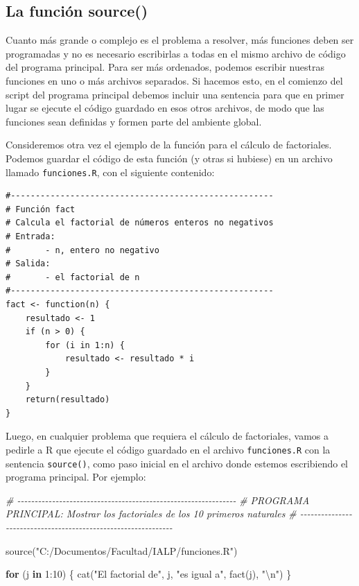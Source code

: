 \documentclass[
]{book}
\newenvironment{Shaded}{\begin{snugshade}}{\end{snugshade}}
\newcommand{\CommentTok}[1]{\textcolor[rgb]{0.56,0.35,0.01}{\textit{#1}}}
\newcommand{\ControlFlowTok}[1]{\textcolor[rgb]{0.13,0.29,0.53}{\textbf{#1}}}
\newcommand{\DecValTok}[1]{\textcolor[rgb]{0.00,0.00,0.81}{#1}}
\newcommand{\FunctionTok}[1]{\textcolor[rgb]{0.00,0.00,0.00}{#1}}
\newcommand{\NormalTok}[1]{#1}
\newcommand{\SpecialCharTok}[1]{\textcolor[rgb]{0.00,0.00,0.00}{#1}}
\newcommand{\StringTok}[1]{\textcolor[rgb]{0.31,0.60,0.02}{#1}}
\begin{document}
\hypertarget{la-funciuxf3n-source}{%
\subsection{La función source()}\label{la-funciuxf3n-source}}

Cuanto más grande o complejo es el problema a resolver, más funciones deben ser programadas y no es necesario escribirlas a todas en el mismo archivo de código del programa principal. Para ser más ordenados, podemos escribir nuestras funciones en uno o más archivos separados. Si hacemos esto, en el comienzo del script del programa principal debemos incluir una sentencia para que en primer lugar se ejecute el código guardado en esos otros archivos, de modo que las funciones sean definidas y formen parte del ambiente global.

Consideremos otra vez el ejemplo de la función para el cálculo de factoriales. Podemos guardar el código de esta función (y otras si hubiese) en un archivo llamado \texttt{funciones.R}, con el siguiente contenido:

\begin{verbatim}
#-----------------------------------------------------
# Función fact
# Calcula el factorial de números enteros no negativos
# Entrada:
#       - n, entero no negativo
# Salida:
#       - el factorial de n
#-----------------------------------------------------
fact <- function(n) {
    resultado <- 1
    if (n > 0) {
        for (i in 1:n) {
            resultado <- resultado * i
        }
    }
    return(resultado)
}
\end{verbatim}

Luego, en cualquier problema que requiera el cálculo de factoriales, vamos a pedirle a R que ejecute el código guardado en el archivo \texttt{funciones.R} con la sentencia \texttt{source()}, como paso inicial en el archivo donde estemos escribiendo el programa principal. Por ejemplo:

\begin{Shaded}
\begin{Highlighting}[]
\CommentTok{\# {-}{-}{-}{-}{-}{-}{-}{-}{-}{-}{-}{-}{-}{-}{-}{-}{-}{-}{-}{-}{-}{-}{-}{-}{-}{-}{-}{-}{-}{-}{-}{-}{-}{-}{-}{-}{-}{-}{-}{-}{-}{-}{-}{-}{-}{-}{-}{-}{-}{-}{-}{-}{-}{-}{-}{-}{-}{-}{-}{-}{-}{-}{-}}
\CommentTok{\# PROGRAMA PRINCIPAL: Mostrar los factoriales de los 10 primeros naturales}
\CommentTok{\# {-}{-}{-}{-}{-}{-}{-}{-}{-}{-}{-}{-}{-}{-}{-}{-}{-}{-}{-}{-}{-}{-}{-}{-}{-}{-}{-}{-}{-}{-}{-}{-}{-}{-}{-}{-}{-}{-}{-}{-}{-}{-}{-}{-}{-}{-}{-}{-}{-}{-}{-}{-}{-}{-}{-}{-}{-}{-}{-}{-}{-}{-}{-}}

\FunctionTok{source}\NormalTok{(}\StringTok{"C:/Documentos/Facultad/IALP/funciones.R"}\NormalTok{)}

\ControlFlowTok{for}\NormalTok{ (j }\ControlFlowTok{in} \DecValTok{1}\SpecialCharTok{:}\DecValTok{10}\NormalTok{) \{}
    \FunctionTok{cat}\NormalTok{(}\StringTok{"El factorial de"}\NormalTok{, j, }\StringTok{"es igual a"}\NormalTok{, }\FunctionTok{fact}\NormalTok{(j), }\StringTok{"}\SpecialCharTok{\textbackslash{}n}\StringTok{"}\NormalTok{)}
\NormalTok{\}}
\end{Highlighting}
\end{Shaded}
\end{document}

